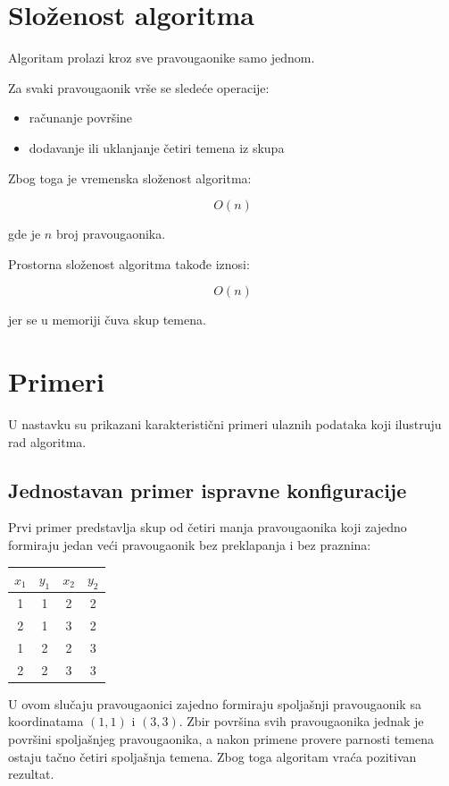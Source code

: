 \documentclass[11pt,a4paper]{article}
\begin{document}
\section{Složenost algoritma}

Algoritam prolazi kroz sve pravougaonike samo jednom.

Za svaki pravougaonik vrše se sledeće operacije:

\begin{itemize}
\item računanje površine
\item dodavanje ili uklanjanje četiri temena iz skupa
\end{itemize}

Zbog toga je vremenska složenost algoritma:

\[
O(n)
\]

gde je $n$ broj pravougaonika.

Prostorna složenost algoritma takođe iznosi:

\[
O(n)
\]

jer se u memoriji čuva skup temena.

\section{Primeri}

U nastavku su prikazani karakteristični primeri ulaznih podataka koji ilustruju rad algoritma.

\subsection{Jednostavan primer ispravne konfiguracije}

Prvi primer predstavlja skup od četiri manja pravougaonika koji zajedno formiraju jedan veći pravougaonik bez preklapanja i bez praznina:

\begin{center}
\begin{tabular}{|c|c|c|c|}
\hline
$x_1$ & $y_1$ & $x_2$ & $y_2$ \\
\hline
1 & 1 & 2 & 2 \\
2 & 1 & 3 & 2 \\
1 & 2 & 2 & 3 \\
2 & 2 & 3 & 3 \\
\hline
\end{tabular}
\end{center}

U ovom slučaju pravougaonici zajedno formiraju spoljašnji pravougaonik sa koordinatama $(1,1)$ i $(3,3)$. 
Zbir površina svih pravougaonika jednak je površini spoljašnjeg pravougaonika, a nakon primene provere parnosti temena ostaju tačno četiri spoljašnja temena. 
Zbog toga algoritam vraća pozitivan rezultat.
\end{document}
